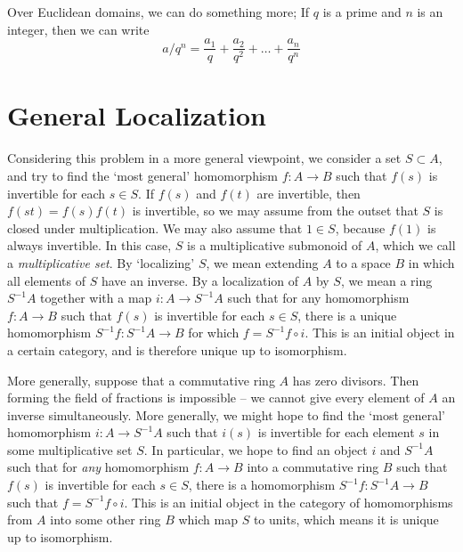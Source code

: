 Over Euclidean domains, we can do something more; If $q$ is a prime and $n$ is an integer, then we can write
%
\[ a/q^n = \frac{a_1}{q} + \frac{a_2}{q^2} + \dots + \frac{a_n}{q^n} \]

\section{General Localization}

Considering this problem in a more general viewpoint, we consider a set $S \subset A$, and try to find the `most general' homomorphism $f: A \to B$ such that $f(s)$ is invertible for each $s \in S$. If $f(s)$ and $f(t)$ are invertible, then $f(st) = f(s)f(t)$ is invertible, so we may assume from the outset that $S$ is closed under multiplication. We may also assume that $1 \in S$, because $f(1)$ is always invertible. In this case, $S$ is a multiplicative submonoid of $A$, which we call a \emph{multiplicative set}. By `localizing' $S$, we mean extending $A$ to a space $B$ in which all elements of $S$ have an inverse. By a localization of $A$ by $S$, we mean a ring $S^{-1}A$ together with a map $i: A \to S^{-1}A$ such that for any homomorphism $f:A \to B$ such that $f(s)$ is invertible for each $s \in S$, there is a unique homomorphism $S^{-1}f: S^{-1}A \to B$ for which $f = S^{-1}f \circ i$. This is an initial object in a certain category, and is therefore unique up to isomorphism.

More generally, suppose that a commutative ring $A$ has zero divisors. Then forming the field of fractions is impossible -- we cannot give every element of $A$ an inverse simultaneously. More generally, we might hope to find the `most general' homomorphism $i: A \to S^{-1}A$ such that $i(s)$ is invertible for each element $s$ in some multiplicative set $S$. In particular, we hope to find an object $i$ and $S^{-1}A$ such that for {\it any} homomorphism $f: A \to B$ into a commutative ring $B$ such that $f(s)$ is invertible for each $s \in S$, there is a homomorphism $S^{-1}f: S^{-1}A \to B$ such that $f = S^{-1}f \circ i$. This is an initial object in the category of homomorphisms from $A$ into some other ring $B$ which map $S$ to units, which means it is unique up to isomorphism.

